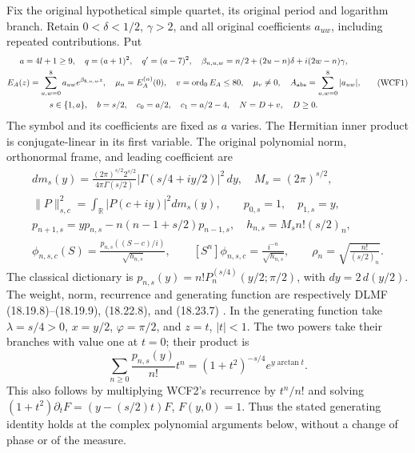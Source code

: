 Fix the original hypothetical simple quartet, its original period and
logarithm branch. Retain $0<\delta<1/2$, $\gamma>2$, and all original
coefficients $a_{uw}$, including repeated contributions. Put
\[
\begin{gathered}
 a=4l+1\ge9,\quad q=(a+1)^2,\quad q'=(a-7)^2,\quad
 \beta_{n,u,w}=n/2+(2u-n)\delta+i(2w-n)\gamma,\\
 E_A(z)=\sum_{u,w=0}^{8}a_{uw}e^{\beta_{8,u,w}z},\quad
 \mu_n=E_A^{(n)}(0),\quad v=\operatorname{ord}_0E_A\le80,
 \quad \mu_v\ne0,\quad A_{\rm abs}=\sum_{u,w=0}^{8}|a_{uw}|,\\
 s\in\{1,a\},\quad b=s/2,\quad c_0=a/2,\quad c_1=a/2-4,
 \quad N=D+v,\quad D\ge0.
\end{gathered}\tag{WCF1}
\]
The symbol and its coefficients are fixed as $a$ varies. The Hermitian
inner product is conjugate-linear in its first variable. The original
polynomial norm, orthonormal frame, and leading coefficient are
\[
\begin{gathered}
 dm_s(y)=\frac{(2\pi)^{s/2}2^{s/2}}{4\pi\Gamma(s/2)}
       |\Gamma(s/4+iy/2)|^2\,dy,\quad M_s=(2\pi)^{s/2},\\
 \|P\|_{s,c}^2=\int_{\mathbb R}|P(c+iy)|^2dm_s(y),\qquad
 p_{0,s}=1,\quad p_{1,s}=y,\\
 p_{n+1,s}=yp_{n,s}-n(n-1+s/2)p_{n-1,s},\quad
 h_{n,s}=M_sn!(s/2)_n,\\
 \phi_{n,s,c}(S)=\frac{p_{n,s}((S-c)/i)}{\sqrt{h_{n,s}}},\qquad
 [S^n]\phi_{n,s,c}=\frac{i^{-n}}{\sqrt{h_{n,s}}},\qquad
 \rho_n=\sqrt{\frac{n!}{(s/2)_n}}.
\end{gathered}\tag{WCF2}
\]
The classical dictionary is
$p_{n,s}(y)=n!P_n^{(s/4)}(y/2;\pi/2)$, with $dy=2\,d(y/2)$.
The weight, norm, recurrence and generating function are respectively
DLMF (18.19.8)--(18.19.9), (18.22.8), and (18.23.7)
\cite{human:dlmf18}. In the generating function take
$\lambda=s/4>0$, $x=y/2$, $\varphi=\pi/2$, and $z=t$, $|t|<1$.
The two powers take their branches with value one at $t=0$; their product is
\[
 \sum_{n\ge0}\frac{p_{n,s}(y)}{n!}t^n
   =(1+t^2)^{-s/4}e^{y\arctan t}.
 \tag{WCF3}
\]
This also follows by multiplying WCF2's recurrence by $t^n/n!$ and
solving $(1+t^2)\partial_t F=(y-(s/2)t)F$, $F(y,0)=1$.
Thus the stated generating identity holds at the complex polynomial
arguments below, without a change of phase or of the measure.

